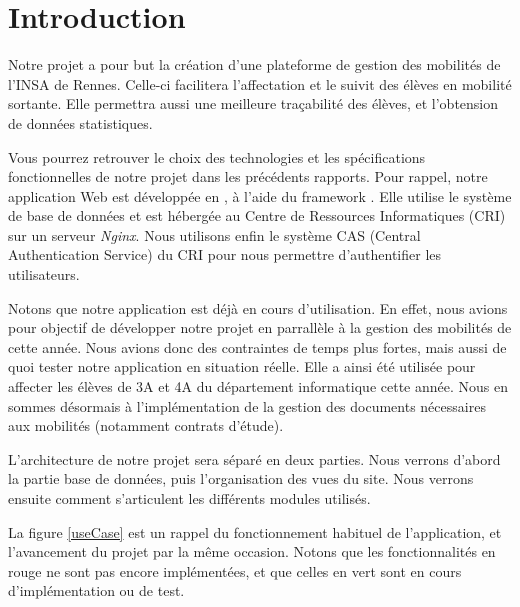 \chapter{Introduction}

Notre projet a pour but la création d'une plateforme de gestion des mobilités de l'INSA de Rennes. Celle-ci facilitera l'affectation et le suivit des élèves en mobilité sortante. Elle permettra aussi une meilleure traçabilité des élèves, et l'obtension de données statistiques.

Vous pourrez retrouver le choix des technologies et les spécifications fonctionnelles de notre projet dans les précédents rapports. Pour rappel, notre application Web est développée en \php, à l'aide du framework \symfony. Elle utilise le système de base de données \mdb et est hébergée au Centre de Ressources Informatiques (CRI) sur un serveur \textit{Nginx}. Nous utilisons enfin le système CAS (Central Authentication Service) du CRI pour nous permettre d'authentifier les utilisateurs.

\bigbreak

Notons que notre application est déjà en cours d'utilisation. En effet, nous avions pour objectif de développer notre projet en parrallèle à la gestion des mobilités de cette année. Nous avions donc des contraintes de temps plus fortes, mais aussi de quoi tester notre application en situation réelle. Elle a ainsi été utilisée pour affecter les élèves de 3A et 4A du département informatique cette année. Nous en sommes désormais à l'implémentation de la gestion des documents nécessaires aux mobilités (notamment contrats d'étude).

\bigbreak

L'architecture de notre projet sera séparé en deux parties. Nous verrons d'abord la partie base de données, puis l'organisation des vues du site. Nous verrons ensuite comment s'articulent les différents modules utilisés.

\bigbreak
La figure \ref{useCase} est un rappel du fonctionnement habituel de l'application, et l'avancement du projet par la même occasion. Notons que les fonctionnalités en rouge ne sont pas encore implémentées, et que celles en vert sont en cours d'implémentation ou de test. 

